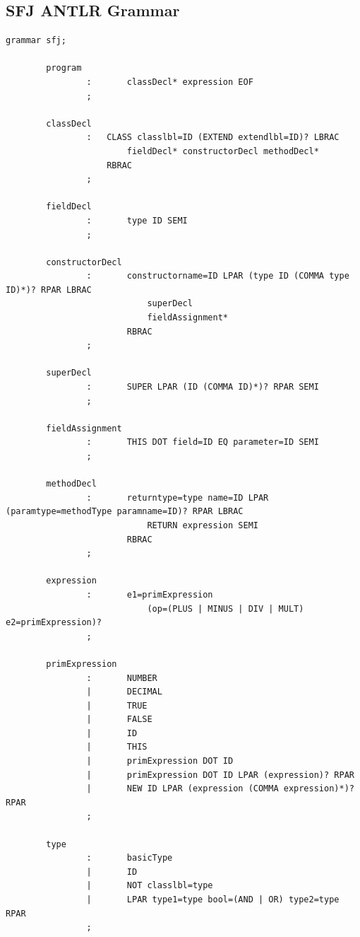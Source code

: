 \documentclass{l4proj}
\begin{document}
\begin{appendices}

    \chapter{SFJ ANTLR Grammar}

    \begin{lstlisting}[label={lst:sfjgrammar}, caption={The full ANTLR grammar for SFJ language}]
        grammar sfj;

        program
                :       classDecl* expression EOF
                ;

        classDecl
                :   CLASS classlbl=ID (EXTEND extendlbl=ID)? LBRAC
                        fieldDecl* constructorDecl methodDecl*
                    RBRAC
                ;

        fieldDecl
                :       type ID SEMI
                ;

        constructorDecl
                :       constructorname=ID LPAR (type ID (COMMA type ID)*)? RPAR LBRAC
                            superDecl
                            fieldAssignment*
                        RBRAC
                ;

        superDecl
                :       SUPER LPAR (ID (COMMA ID)*)? RPAR SEMI
                ;

        fieldAssignment
                :       THIS DOT field=ID EQ parameter=ID SEMI
                ;

        methodDecl
                :       returntype=type name=ID LPAR (paramtype=methodType paramname=ID)? RPAR LBRAC
                            RETURN expression SEMI
                        RBRAC
                ;

        expression
                :       e1=primExpression
                            (op=(PLUS | MINUS | DIV | MULT) e2=primExpression)?
                ;

        primExpression
                :       NUMBER
                |       DECIMAL
                |       TRUE
                |       FALSE
                |       ID
                |       THIS
                |       primExpression DOT ID
                |       primExpression DOT ID LPAR (expression)? RPAR
                |       NEW ID LPAR (expression (COMMA expression)*)? RPAR
                ;

        type
                :       basicType
                |       ID
                |       NOT classlbl=type
                |       LPAR type1=type bool=(AND | OR) type2=type RPAR
                ;


\end{lstlisting}
\end{appendices}
\end{document}
